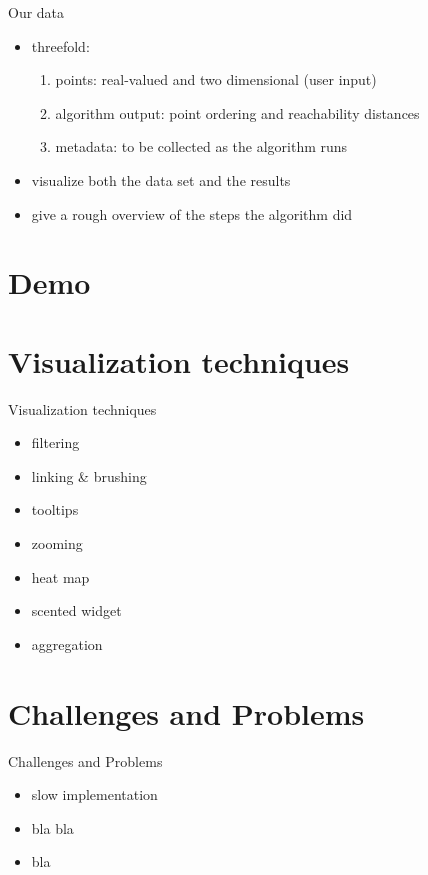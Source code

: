 \documentclass[naustrian]{beamer}
\begin{document}
\begin{frame}{Our data}
    \begin{itemize}
        \item threefold:
            \begin{enumerate}
                \item points: real-valued and two dimensional (user input)
                \item algorithm output: point ordering and reachability distances
                \item metadata: to be collected as the algorithm runs
            \end{enumerate}
        \item visualize both the data set and the results
        \item give a rough overview of the steps the algorithm did
    \end{itemize}
\end{frame}

{
\section{Demo}
}


\section{Visualization techniques}

\begin{frame}{Visualization techniques}
    \begin{itemize}
        \item filtering
        \item linking \& brushing
        \item tooltips
        \item zooming
        \item heat map
        \item scented widget
        \item aggregation
    \end{itemize}
\end{frame}

\section{Challenges and Problems}

\begin{frame}{Challenges and Problems}
    \begin{itemize}
        \item slow implementation
        \item bla bla
        \item bla
    \end{itemize}
\end{frame}
\end{document}
